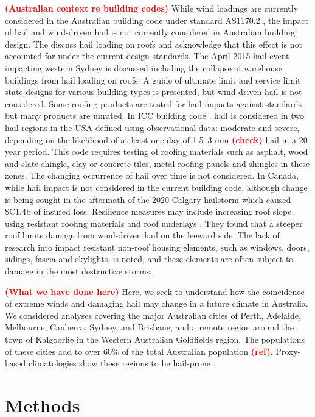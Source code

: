 \documentclass[]{agujournal2019}\usepackage[]{graphicx}\usepackage[]{xcolor}
\newcommand*{\todo}[1]{\textbf{\textcolor{red}{(#1)}}}
\newcommand*{\mref}{\todo{ref}}
\begin{document}
\todo{Australian context re building codes} While wind loadings are currently considered in the Australian building code \cite{ABCB_2024} under standard AS1170.2 \cite{Standards_2021}, the impact of hail and wind-driven hail is not currently considered in Australian building design. The  discuss hail loading on roofs and acknowledge that this effect is not accounted for under the current design standards. The April 2015 hail event impacting western Sydney is discussed including the collapse of warehouse buildings from hail loading on roofs. A guide of ultimate limit and service limit state designs for various building types is presented, but wind driven hail is not considered. Some roofing products are tested for hail impacts against standards, but many products are unrated. In ICC building code \cite{ICC_2008}, hail is considered in two hail regions in the USA defined using observational data: moderate and severe, depending on the likelihood of at least one day of 1.5--3 mm \todo{check} hail in a 20-year period. This code requires testing of roofing materials such as asphalt, wood and slate shingle, clay or concrete tiles, metal roofing panels and shingles in these zones. The changing occurrence of hail over time is not considered. In Canada, while hail impact is not considered in the current building code, although change is being sought in the aftermath of the 2020 Calgary hailstorm which caused \$C1.4b of insured loss. Resilience measures may include increasing roof slope, using resistant roofing materials and roof underlays \cite{ICLR_2018}. They found that a steeper roof limits damage from wind-driven hail on the leeward side. The lack of research into impact resistant non-roof housing elements, such as windows, doors, sidings, fascia and skylights, is noted, and these elements are often subject to damage in the most destructive storms.

\todo{What we have done here} Here, we seek to understand how the coincidence of extreme winds and damaging hail may change in a future climate in Australia. We considered analyses covering the major Australian cities of Perth, Adelaide, Melbourne, Canberra, Sydney, and Brisbane, and a remote region around the town of Kalgoorlie in the Western Australian Goldfields region. The populations of these cities add to over 60\% of the total Australian population \mref{}. Proxy-based climatologies show these regions to be hail-prone \cite{Raupach_npjCAS_2023}.

\section{Methods}
\end{document}
